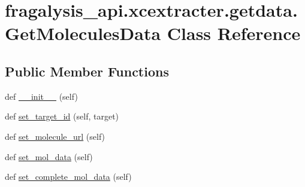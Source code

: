 \hypertarget{classfragalysis__api_1_1xcextracter_1_1getdata_1_1_get_molecules_data}{}\section{fragalysis\+\_\+api.\+xcextracter.\+getdata.\+Get\+Molecules\+Data Class Reference}
\label{classfragalysis__api_1_1xcextracter_1_1getdata_1_1_get_molecules_data}
\subsection*{Public Member Functions}
\begin{DoxyCompactItemize}
\item 
def \hyperlink{classfragalysis__api_1_1xcextracter_1_1getdata_1_1_get_molecules_data_a11e4a33bfbb0ff558ef33a0e8a46c76b}{\+\_\+\+\_\+init\+\_\+\+\_\+} (self)
\item 
def \hyperlink{classfragalysis__api_1_1xcextracter_1_1getdata_1_1_get_molecules_data_acc782fb40405a434903f6d3e80624c9c}{set\+\_\+target\+\_\+id} (self, target)
\item 
def \hyperlink{classfragalysis__api_1_1xcextracter_1_1getdata_1_1_get_molecules_data_a61f7510bc705fab0ee33128872619f40}{set\+\_\+molecule\+\_\+url} (self)
\item 
def \hyperlink{classfragalysis__api_1_1xcextracter_1_1getdata_1_1_get_molecules_data_ab1f0b5b8edbd496d800e08c7f8758a53}{set\+\_\+mol\+\_\+data} (self)
\item 
def \hyperlink{classfragalysis__api_1_1xcextracter_1_1getdata_1_1_get_molecules_data_a5bf2f4562196e169f76aa30cdcd9029d}{set\+\_\+complete\+\_\+mol\+\_\+data} (self)
\end{DoxyCompactItemize}
